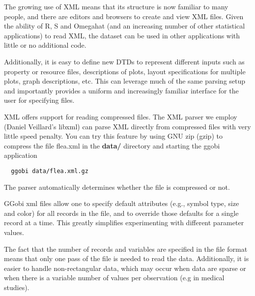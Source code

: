 \documentclass{article}
\def\strip#1>{}
\def\Escape#1{\def\next{#1}%
{\frenchspacing\expandafter\strip\meaning\next}}
\def\dir#1{\textbf{\Escape{#1/}}}
\def\directory#1{\dir{#1}}
\begin{document}
The growing use of XML means that its structure is now familiar to
many people, and there are editors and browsers to create and view XML
files.  Given the ability of R, S and Omegahat (and an increasing
number of other statistical applications) to read XML, the dataset can
be used in other applications with little or no additional code.


Additionally, it is easy to define new DTDs to represent different
inputs such as property or resource files, descriptions of plots,
layout specifications for multiple plots, graph descriptions, etc.
This can leverage much of the same parsing setup and importantly
provides a uniform and increasingly familiar interface for the user
for specifying files.


XML offers support for reading compressed files.  The XML parser we
employ (Daniel Veillard's libxml) can parse XML directly from
compressed files with very little speed penalty.  You can try this
feature by using GNU zip (gzip) to compress the file flea.xml in the
\directory{data} directory and starting the ggobi application
\begin{verbatim}
  ggobi data/flea.xml.gz
\end{verbatim}
The parser automatically determines whether the file is compressed or
not.



GGobi xml files allow one to specify default attributes (e.g., symbol
type, size and color) for all records in the file, and to override
those defaults for a single record at a time.  This greatly simplifies
experimenting with different parameter values.


The fact that the number of records and variables are specified in the
file format means that only one pass of the file is needed to read the
data.  Additionally, it is easier to handle non-rectangular data,
which may occur when data are sparse or when there is a variable number
of values per observation (e.g in medical studies).
\end{document}
